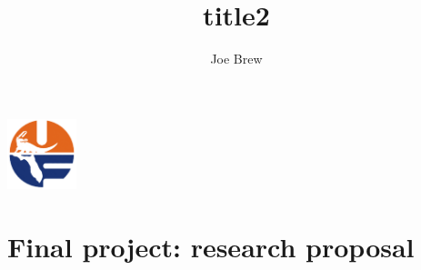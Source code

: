 \documentclass[11pt]{article}
\begin{document}


\title{\textbf{title2}}
\author{Joe Brew}


\maketitle

\emph{
\blindtext
}
\tableofcontents

\vspace{20mm}

\begin{center}
\includegraphics[width=2cm]{uf}
\end{center}




\section*{Final project: research proposal}
\hrulefill
\end{document}
